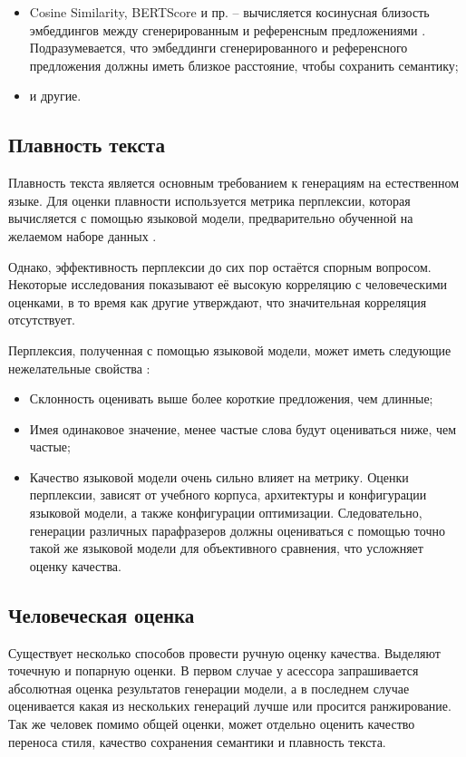 \begin{itemize}
    \item Cosine Similarity, BERTScore и пр. -- вычисляется косинусная близость эмбеддингов между сгенерированным и референсным предложениями \cite{fu2017style, zhang2020bertscore}. Подразумевается, что эмбеддинги сгенерированного и референсного предложения должны иметь близкое расстояние, чтобы сохранить семантику;
    \item и другие.
\end{itemize}

\subsection{Плавность текста}
Плавность текста является основным требованием к генерациям на естественном языке.
Для оценки плавности используется метрика перплексии, которая вычисляется с помощью языковой модели, предварительно обученной на желаемом наборе данных \cite{yang2019unsupervised}.


Однако, эффективность перплексии до сих пор остаётся спорным вопросом. Некоторые исследования \cite{pang2019unsupervised} показывают её высокую корреляцию с человеческими оценками, в то время как другие \cite{mir2019evaluating} утверждают, что значительная корреляция отсутствует.

Перплексия, полученная с помощью языковой модели, может иметь следующие нежелательные свойства \cite{jin2021deep}:
\begin{itemize}
    \item Склонность оценивать выше более короткие предложения, чем длинные;
    \item Имея одинаковое значение, менее частые слова будут оцениваться ниже, чем частые;
    \item Качество языковой модели очень сильно влияет на метрику. Оценки перплексии, зависят от учебного корпуса, архитектуры и конфигурации языковой модели, а также конфигурации оптимизации. Следовательно, генерации различных парафразеров должны оцениваться с помощью точно такой же языковой модели для объективного сравнения, что усложняет оценку качества.
\end{itemize}

\subsection{Человеческая оценка}
Существует несколько способов провести ручную оценку качества.
Выделяют точечную и попарную оценки. В первом случае у асессора запрашивается абсолютная оценка результатов генерации модели, а в последнем случае оценивается какая из нескольких генераций лучше или просится ранжирование. Так же человек помимо общей оценки, может отдельно оценить качество переноса стиля, качество сохранения семантики и плавность текста.

